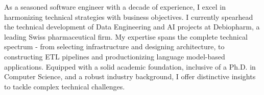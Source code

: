 

\begin{cvparagraph}

As a seasoned software engineer with a decade of experience, I excel in harmonizing technical strategies with business objectives. 
I currently spearhead the technical development of Data Engineering and AI projects at Debiopharm, a leading Swiss pharmaceutical firm. 
My expertise spans the complete technical spectrum - from selecting infrastructure and designing architecture, to constructing ETL pipelines and productionizing language model-based applications. 
Equipped with a solid academic foundation, inclusive of a Ph.D. in Computer Science, and a robust industry background, I offer distinctive insights to tackle complex technical challenges.
\end{cvparagraph}
